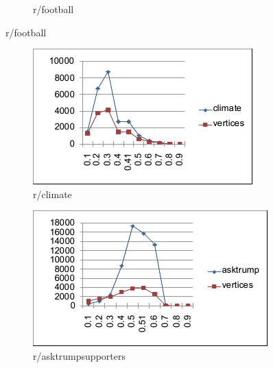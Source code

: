 \documentclass{beamer}
\begin{document}
\begin{frame}[c]
\begin{figure}
\begin{center}
\begin{subfigure}[b]{0.3\textwidth}
				\caption{r/football}
				\label{fig:out/alpha/football_alpha.png}
			\end{subfigure}
		\end{center}
	\end{figure}

	\begin{figure}
		\begin{center}
			\begin{subfigure}[b]{0.3\textwidth}
				\centering
				\includegraphics[width=\textwidth]{out/alpha/climate_alpha.png}
				\caption{r/climate}
				\label{fig:out/alpha/climate_alpha.png}
			\end{subfigure}
			\begin{subfigure}[b]{0.3\textwidth}
				\centering
				\includegraphics[width=\textwidth]{out/alpha/asktrump_alpha.png}
				\caption{r/asktrumpsupporters}
				\label{fig:out/alpha/asktrump_alpha.png}
			\end{subfigure}
			\begin{subfigure}[b]{0.3\textwidth}
				\centering

\end{subfigure}
\end{center}
\end{figure}
\end{frame}
\end{document}
